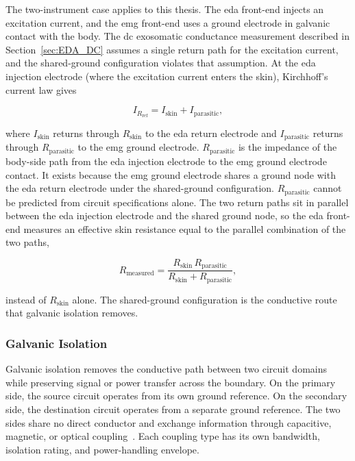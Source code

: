 The two-instrument case applies to this thesis. The \gls{eda} front-end injects an excitation current, and the \gls{emg} front-end uses a ground electrode in galvanic contact with the body. The \gls{dc} exosomatic conductance measurement described in Section~\ref{sec:EDA_DC} assumes a single return path for the excitation current, and the shared-ground configuration violates that assumption. At the \gls{eda} injection electrode (where the excitation current enters the skin), Kirchhoff's current law gives

\begin{equation}
I_{R_{\text{ref}}} = I_{\text{skin}} + I_{\text{parasitic}},
\label{eq:kcl_eda_active}
\end{equation}

where $I_{\text{skin}}$ returns through $R_{\text{skin}}$ to the \gls{eda} return electrode and $I_{\text{parasitic}}$ returns through $R_{\text{parasitic}}$ to the \gls{emg} ground electrode. $R_{\text{parasitic}}$ is the impedance of the body-side path from the \gls{eda} injection electrode to the \gls{emg} ground electrode contact. It exists because the \gls{emg} ground electrode shares a ground node with the \gls{eda} return electrode under the shared-ground configuration. $R_{\text{parasitic}}$ cannot be predicted from circuit specifications alone. The two return paths sit in parallel between the \gls{eda} injection electrode and the shared ground node, so the \gls{eda} front-end measures an effective skin resistance equal to the parallel combination of the two paths,

\begin{equation}
R_{\text{measured}} = \frac{R_{\text{skin}} \, R_{\text{parasitic}}}{R_{\text{skin}} + R_{\text{parasitic}}},
\label{eq:r_measured}
\end{equation}

instead of $R_{\text{skin}}$ alone. The shared-ground configuration is the conductive route that galvanic isolation removes.

\subsubsection{Galvanic Isolation}
\label{sec:galvanic_isolation_theory}

Galvanic isolation removes the conductive path between two circuit domains while preserving signal or power transfer across the boundary. On the primary side, the source circuit operates from its own ground reference. On the secondary side, the destination circuit operates from a separate ground reference. The two sides share no direct conductor and exchange information through capacitive, magnetic, or optical coupling~\cite{webster_medical_2020}. Each coupling type has its own bandwidth, isolation rating, and power-handling envelope.

